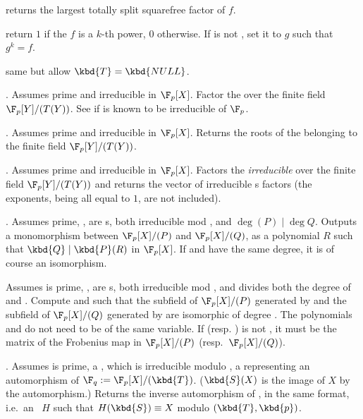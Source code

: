  returns the largest totally
split squarefree factor of $f$.

return $1$ if the  $f$ is a $k$-th power, $0$ otherwise.
If  is not , set it to $g$ such that $g^k = f$.

same but allow $\kbd{T} = \kbd{NULL}$.

. Assumes  prime
and  irreducible in $\F_p[X]$. Factor the  
over the finite field $\F_p[Y]/(T(Y))$. See 
if  is known to be irreducible of $\F_p$.

. Assumes  prime
and  irreducible in $\F_p[X]$. Returns the roots of the 
 belonging to the finite field $\F_p[Y]/(T(Y))$.

. Assumes  prime
and  irreducible in $\F_p[X]$. Factors the \emph{irreducible}
  over the finite field $\F_p[Y]/(T(Y))$ and returns the
vector of irreducible s factors (the exponents, being all equal to
$1$, are not included).

. Assumes  prime,
,  are s, both irreducible mod , and
$\deg(P) \mid \deg Q$. Outputs a monomorphism between $\F_p[X]/(P)$ and
$\F_p[X]/(Q)$, as a polynomial $R$ such that $\kbd{Q} \mid \kbd{P}(R)$ in
$\F_p[X]$. If  and  have the same degree, it is of course an
isomorphism.

\hfil\break
Assumes  is prime, ,  are s, both
irreducible mod , and  divides both the degree of  and
. Compute  and  such that the subfield of
$\F_p[X]/(P)$ generated by  and the subfield of $\F_p[X]/(Q)$
generated by  are isomorphic of degree . The polynomials
 and  do not need to be of the same variable. If 
(resp. ) is not , it must be the matrix of the Frobenius
map in $\F_p[X]/(P)$ (resp.~$\F_p[X]/(Q)$).

. Assumes  is prime,
 a , which is irreducible modulo ,  a
 representing an automorphism of $\F_q := \F_p[X]/(\kbd{T})$.
($\kbd{S}(X)$ is the image of $X$ by the automorphism.) Returns the
inverse automorphism of , in the same format, i.e.~an ~$H$
such that $H(\kbd{S}) \equiv X$ modulo $(\kbd{T}, \kbd{p})$.

